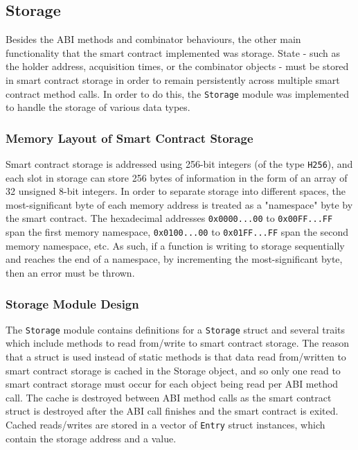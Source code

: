 \subsection{Storage} \label{storage}

Besides the ABI methods and combinator behaviours, the other main functionality that the smart contract implemented was storage. State - such as the holder address, acquisition times, or the combinator objects - must be stored in smart contract storage in order to remain persistently across multiple smart contract method calls. In order to do this, the \texttt{Storage} module was implemented to handle the storage of various data types.


\subsubsection{Memory Layout of Smart Contract Storage}

Smart contract storage is addressed using 256-bit integers (of the type \texttt{H256}), and each slot in storage can store 256 bytes of information in the form of an array of 32 unsigned 8-bit integers. In order to separate storage into different spaces, the most-significant byte of each memory address is treated as a "namespace" byte by the smart contract. The hexadecimal addresses \texttt{0x0000...00} to \texttt{0x00FF...FF} span the first memory namespace, \texttt{0x0100...00} to \texttt{0x01FF...FF} span the second memory namespace, etc. As such, if a function is writing to storage sequentially and reaches the end of a namespace, by incrementing the most-significant byte, then an error must be thrown.


\subsubsection{Storage Module Design}

The \texttt{Storage} module contains definitions for a \texttt{Storage} struct and several traits which include methods to read from/write to smart contract storage. The reason that a struct is used instead of static methods is that data read from/written to smart contract storage is cached in the Storage object, and so only one read to smart contract storage must occur for each object being read per ABI method call. The cache is destroyed between ABI method calls as the smart contract struct is destroyed after the ABI call finishes and the smart contract is exited. Cached reads/writes are stored in a vector of \texttt{Entry} struct instances, which contain the storage address and a value. \\


